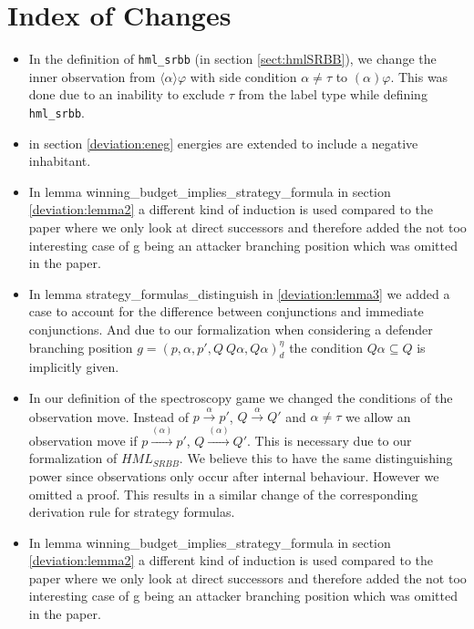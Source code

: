 \section{Index of Changes}
\begin{itemize}
  \item In the definition of \texttt{hml\_srbb} (in section \ref{sect:hmlSRBB}), we change the inner observation from
  $\langle\alpha\rangle\varphi$ with side condition $\alpha \neq \tau$ to $(\alpha)\varphi$.
  This was done due to an inability to exclude $\tau$ from the label type while defining \texttt{hml\_srbb}. 
  
  \item in section \ref{deviation:eneg} energies are extended to include a negative inhabitant. 
  
  \item  In lemma winning\_budget\_implies\_strategy\_formula in section \ref{deviation:lemma2} a different kind of induction is used compared to the paper 
  where we only look at direct successors and therefore added the not too interesting case of g being an 
  attacker branching position which was omitted in the paper.
  
  \item In lemma strategy\_formulas\_distinguish in  \ref{deviation:lemma3} we added a case to account for the difference between 
  conjunctions and immediate conjunctions. And due to our formalization when considering a
  defender branching position $g=(p,\alpha ,p', Q \ Q\alpha, Q\alpha)_d^\eta$ the condition 
  $Q \alpha \subseteq Q$ is implicitly given.
  
  \item In our definition of the spectroscopy game we changed the conditions of the observation move. 
  Instead of $p \overset{\alpha}{\longrightarrow}p'$, $Q \overset{\alpha}{\longrightarrow} Q'$ and $\alpha \neq \tau$
  we allow an observation move if  $p \overset{(\alpha)}{\longrightarrow}p'$, $Q \overset{(\alpha)}{\longrightarrow} Q'$.
  This is necessary due to our formalization of $HML_{SRBB}$. We believe this to have the same distinguishing power 
  since observations only occur after internal behaviour. However we omitted a proof. 
  This results in a similar change of the corresponding derivation rule for strategy formulas.
  
  \item In lemma winning\_budget\_implies\_strategy\_formula in section \ref{deviation:lemma2} a different kind of induction is used compared to the paper 
  where we only look at direct successors and therefore added the not too interesting case of g being an 
  attacker branching position which was omitted in the paper.
  

\end{itemize}
